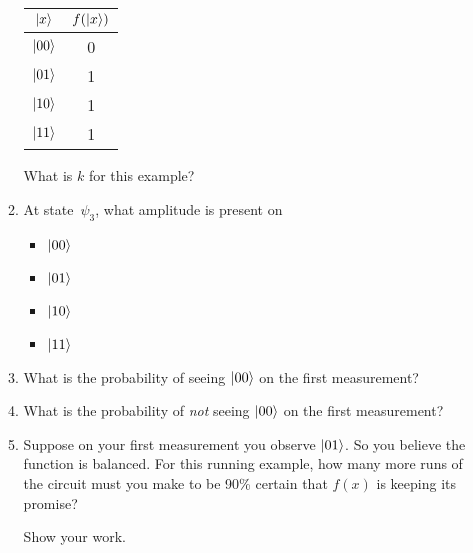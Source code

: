 \documentclass[12pt]{article}
\begin{document}
\begin{enumerate}[font=\bfseries]
\begin{enumerate}[label=\theenumi.\arabic*]
\begin{center}
\begin{tabular}{c|c}
                 $\ket{x}$&$f(\ket{x})$  \\\hline
                 $\ket{00}$ & 0 \\
                 $\ket{01}$ & 1 \\
                 $\ket{10}$ & 1 \\
                 $\ket{11}$ & 1 \\
            \end{tabular}
        \end{center}
        What is $k$ for this example? 
        \item At state~$\psi_{3}$, what amplitude is present on
        \begin{itemize}
            \item $\ket{00}$ 
            \Ans{
            \[
            \frac{(1\times 1) + (-1\times 1) + (-1\times 1) +  (-1\times 1)}{4} = -\frac{1}{2}
            \]
            }
             \item $\ket{01}$
                         \Ans{
            \[
            \frac{(1\times 1) + (-1\times -1) + (-1\times 1) +  (-1\times -1)}{4} = \frac{1}{2}
            \]
            }
              \item $\ket{10}$
              \Ans{
            \[
            \frac{(1\times 1) + (-1\times 1) + (-1\times -1) +  (-1\times -1)}{4} = \frac{1}{2}
            \]
            }
               \item $\ket{11}$
               \Ans{
            \[
            \frac{(1\times 1) + (-1\times -1) + (-1\times -1) +  (-1\times 1)}{4} = \frac{1}{2}
            \]
            }
        \end{itemize}
        \item What is the probability of seeing $\ket{00}$ on the first measurement? 
        \item What is the probability of \emph{not} seeing $\ket{00}$ on the first measurement? 
        \item Suppose on your first measurement you observe $\ket{01}$.  So you believe the function is balanced.  For this running example, how many more runs of the circuit must you make to be 90\% certain that $f(x)$ is keeping its promise?   

        Show your work.
        
        


\end{enumerate}
\end{enumerate}
\end{document}
